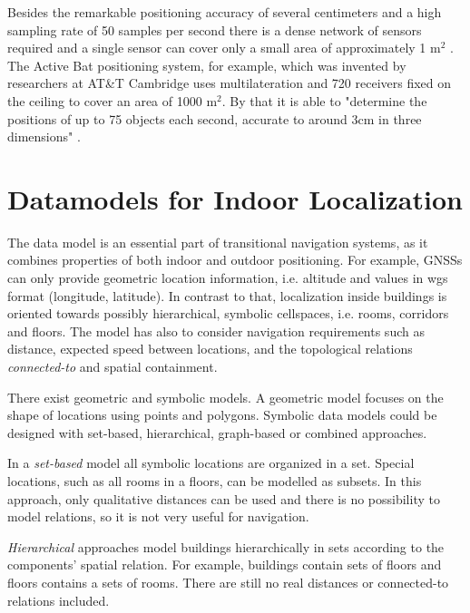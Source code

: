 Besides the remarkable positioning accuracy of several centimeters and a high sampling rate of 50 samples per second there is a dense network of sensors required and a single sensor can cover only a small area of approximately 1 m$^2$ \cite{surveyIPS}. The Active Bat positioning system, for example, which was invented by researchers at AT\&T Cambridge uses multilateration and 720 receivers fixed on the ceiling to cover an area of 1000 m$^2$. By that it is able to "determine the positions of up to 75 objects each second, accurate to around 3cm in three dimensions" \cite{activeBat}.

\section{Datamodels for Indoor Localization}
The data model is an essential part of transitional navigation systems, as it combines properties of both indoor and outdoor positioning. For example, GNSSs can only provide geometric location information, i.e. altitude and values in \ac{wgs} format (longitude, latitude). In contrast to that, localization inside buildings is oriented towards possibly hierarchical, symbolic cellspaces, i.e. rooms, corridors and floors. 
The model has also to consider navigation requirements such as distance, expected speed between locations, and the topological relations \textit{connected-to} and spatial containment.

There exist geometric and symbolic models.
A geometric model focuses on the shape of locations using points and polygons. 
Symbolic data models could be designed with set-based, hierarchical, graph-based or combined approaches. 

In a \textit{set-based} model all symbolic locations are organized in a set. Special locations, such as all rooms in a floors, can be modelled as subsets.
In this approach, only qualitative distances can be used and there is no possibility to model relations, so it is not very useful for navigation.

\textit{Hierarchical} approaches model buildings hierarchically in sets according to the components' spatial relation. For example, buildings contain sets of floors and floors contains a sets of rooms.
There are still no real distances or connected-to relations included.

